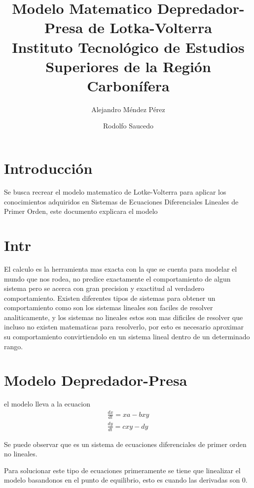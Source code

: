 \documentclass{report}
\title{
	{Modelo Matematico Depredador-Presa de Lotka-Volterra}\\
	{\large Instituto Tecnológico de Estudios Superiores de la Región Carbonífera}\\
}
\author{Alejandro Méndez Pérez \and Rodolfo Saucedo}
\begin{document}

\maketitle
\newpage
\tableofcontents
\chapter*{Introducción}
Se busca recrear el modelo matematico de Lotke-Volterra para aplicar los conocimientos adquiridos en Sistemas de Ecuaciones Diferenciales Lineales de Primer Orden, este documento explicara el modelo

\chapter*{Intr}
El calculo es la herramienta mas exacta con la que se cuenta para modelar el mundo que nos rodea, no predice exactamente el comportamiento de algun sistema pero se acerca con gran precision y exactitud al verdadero comportamiento. Existen diferentes tipos de sistemas para obtener un comportamiento como son los sistemas lineales son faciles de resolver analiticamente, y los sistemas no lineales estos son mas dificiles de resolver que incluso no existen matematicas para resolverlo, por esto es necesario aproximar su comportamiento convirtiendolo en un sistema lineal dentro de un determinado rango.

\chapter{Modelo Depredador-Presa}

el modelo lleva a la ecuacion 
\begin{align}
\frac{dx}{dt}= xa-bxy  \label{eq:EDOsnoLin}\\
\frac{dy}{dt}= cxy-dy
\end{align}

Se puede observar que es un sistema de ecuaciones diferenciales de primer orden no lineales.

Para solucionar este tipo de ecuaciones primeramente se tiene que linealizar el modelo basandonos en el punto de equilibrio, esto es cuando las derivadas son 0.

\end{document}
